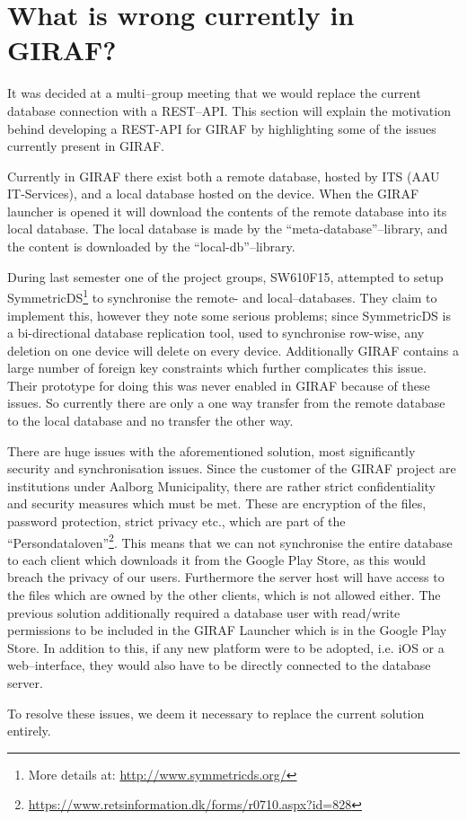 \section{What is wrong currently in GIRAF?} %
It was decided at a multi--group meeting that we would replace the current database connection with a REST--API.
This section will explain the motivation behind developing a REST-API for GIRAF by highlighting some of the issues currently present in GIRAF.

Currently in GIRAF there exist both a remote database, hosted by ITS (AAU IT-Services), and a local database hosted on the device.
When the GIRAF launcher is opened it will download the contents of the remote database into its local database.
The local database is made by the ``meta-database''--library, and the content is downloaded by the ``local-db''--library.

During last semester one of the project groups, SW610F15, attempted to setup SymmetricDS\footnote{More details at: \url{http://www.symmetricds.org/}} to synchronise the remote- and local--databases.
They claim to implement this, however they note some serious problems; since SymmetricDS is a bi-directional database replication tool, used to synchronise row-wise, any deletion on one device will delete on every device.
Additionally GIRAF contains a large number of foreign key constraints which further complicates this issue.
Their prototype for doing this was never enabled in GIRAF because of these issues.
So currently there are only a one way transfer from the remote database to the local database and no transfer the other way.

\bigskip
There are huge issues with the aforementioned solution, most significantly security and synchronisation issues.
Since the customer of the GIRAF project are institutions under Aalborg Municipality, there are rather strict confidentiality and security measures which must be met.
These are encryption of the files, password protection, strict privacy etc., which are part of the ``Persondataloven''\footnote{\url{https://www.retsinformation.dk/forms/r0710.aspx?id=828}}.
This means that we can not synchronise the entire database to each client which downloads it from the Google Play Store, as this would breach the privacy of our users.
Furthermore the server host will have access to the files which are owned by the other clients, which is not allowed either.
The previous solution additionally required a database user with read/write permissions to be included in the GIRAF Launcher which is in the Google Play Store.
In addition to this, if any new platform were to be adopted, i.e. iOS or a web--interface, they would also have to be directly connected to the database server.

To resolve these issues, we deem it necessary to replace the current solution entirely.
